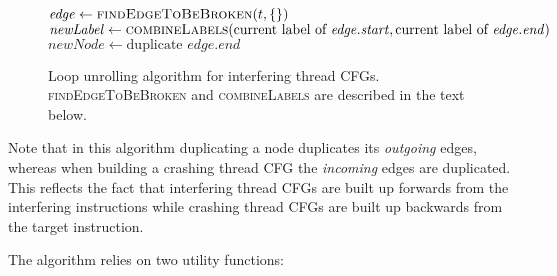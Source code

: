 \begin{figure}
\begin{algorithmic}
       \State $\mathit{edge} \gets \textsc{findEdgeToBeBroken}(t, \{\})$
       \State $\mathit{newLabel} \gets \textsc{combineLabels}(\text{current label of } \mathit{edge}.\mathit{start}, \text{current label of } \mathit{edge}.\mathit{end})$
       \Else
           \State $\mathit{newNode} \gets \text{duplicate } \mathit{edge}.\mathit{end}$
           \EndFor
       \EndIf
    \EndWhile
  \EndFor
\end{algorithmic}
\caption{Loop unrolling algorithm for interfering thread CFGs.
  \textsc{findEdgeToBeBroken} and \textsc{combineLabels} are described
  in the text below.}
\label{fig:derive:store_cfg_unroll_alg}
\end{figure}

Note that in this algorithm duplicating a node duplicates its
\emph{outgoing} edges, whereas when building a crashing thread CFG the
\emph{incoming} edges are duplicated.  This reflects the fact that
interfering thread CFGs are built up forwards from the interfering
instructions while crashing thread CFGs are built up backwards from
the target instruction.

The algorithm relies on two utility functions:

